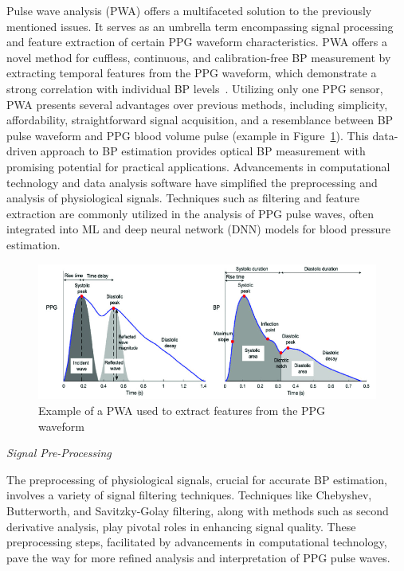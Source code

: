 Pulse wave analysis (PWA) offers a multifaceted solution to the previously mentioned issues.
It serves as an umbrella term encompassing signal processing and feature extraction of certain PPG waveform characteristics.
PWA offers a novel method for cuffless, continuous, and calibration-free BP measurement by extracting temporal features from the PPG waveform, which demonstrate a strong correlation with individual BP levels~\cite{elgendiAnalysisFingertipPhotoplethysmogram2012}.
Utilizing only one PPG sensor, PWA presents several advantages over previous methods, including simplicity, affordability, straightforward signal acquisition, and a resemblance between BP pulse waveform and PPG blood volume pulse (example in Figure~\ref{fig:pwa}).
This data-driven approach to BP estimation provides optical BP measurement with promising potential for practical applications.
Advancements in computational technology and data analysis software have simplified the preprocessing and analysis of physiological signals.
Techniques such as filtering and feature extraction are commonly utilized in the analysis of PPG pulse waves, often integrated into ML and deep neural network (DNN) models for blood pressure estimation.
\begin{figure}[h]
    \includegraphics[width=\textwidth]{images/sp/pwa}
    \caption{Example of a PWA used to extract features from the PPG waveform~\cite{bikiaLeveragingPotentialMachine2021}}
    \label{fig:pwa}
\end{figure}

\vspace{0.2cm}
\textit{Signal Pre-Processing}
\vspace{0.2cm}

The preprocessing of physiological signals, crucial for accurate BP estimation, involves a variety of signal filtering techniques.
Techniques like Chebyshev, Butterworth, and Savitzky-Golay filtering, along with methods such as second derivative analysis, play pivotal roles in enhancing signal quality.
These preprocessing steps, facilitated by advancements in computational technology, pave the way for more refined analysis and interpretation of PPG pulse waves.

